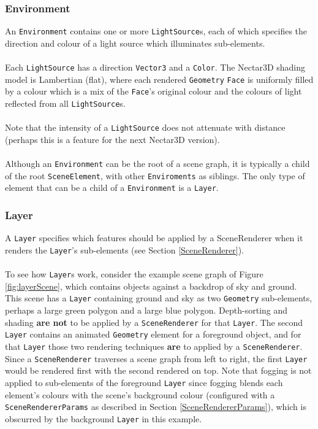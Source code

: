 \documentclass[10pt,aps, prb,preprint]{article}
\begin{document}
\subsubsection{Environment}
An \texttt{Environment} contains one or more \texttt{LightSource}s, each of which specifies the direction and colour of a light source which illuminates sub-elements. 
\\
\\
Each \texttt{LightSource} has a direction \texttt{Vector3} and a \texttt{Color}. The Nectar3D shading model is Lambertian (flat), where each rendered \texttt{Geometry} \texttt{Face} is uniformly filled by a colour which is a mix of the \texttt{Face}'s original colour and the colours of light reflected from all \texttt{LightSource}s.
\\
\\
Note that the intensity of a \texttt{LightSource} does not attenuate with distance (perhaps this is a feature for the next Nectar3D version).
\\
\\
Although an \texttt{Environment} can be the root of a scene graph, it is typically a child of the root \texttt{SceneElement}, with other \texttt{Enviroments} as siblings. The only type of element that can be a child of a \texttt{Environment} is a \texttt{Layer}. 



\subsubsection{Layer}
A \texttt{Layer} specifies which features should be applied by a SceneRenderer when it renders the \texttt{Layer}'s sub-elements (see Section \ref{SceneRenderer}). 
\\
\\
To see how \texttt{Layer}s work, consider the example scene graph of Figure \ref{fig:layerScene}, which contains objects against a backdrop of sky and ground. This scene has a \texttt{Layer} containing ground and sky as two \texttt{Geometry} sub-elements, perhaps a large green polygon and a large blue polygon. Depth-sorting and shading \textbf{are not} to be applied by a \texttt{SceneRenderer} for that \texttt{Layer}. The second \texttt{Layer} contains an animated \texttt{Geometry} element for a foreground object, and for that \texttt{Layer} those two rendering techniques \textbf{are} to applied by a \texttt{SceneRenderer}. Since a \texttt{SceneRenderer} traverses a scene graph from left to right, the first \texttt{Layer} would be rendered first with the second rendered on top. Note that fogging is not applied to sub-elements of the foreground \texttt{Layer} since fogging blends each element's colours with the scene's background colour (configured with a \texttt{SceneRendererParams} as described in Section \ref{SceneRendererParams}), which is obscurred by the background \texttt{Layer} in this example.
\end{document}
